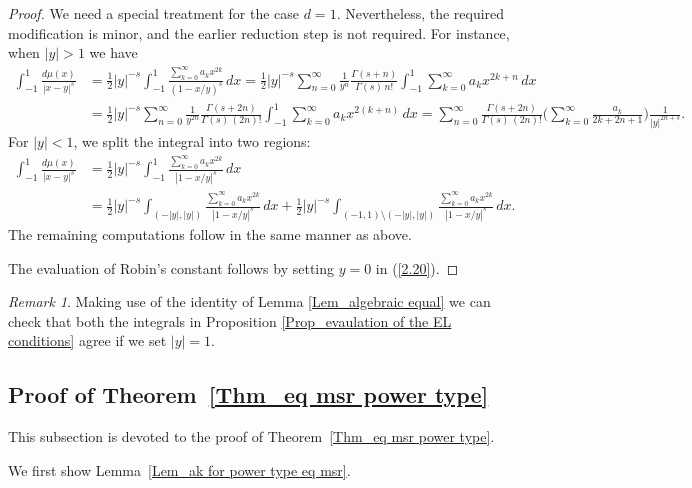 \documentclass[10pt]{amsart}
\theoremstyle{plain}
\theoremstyle{remark}
\newtheorem{rem}{Remark}
\numberwithin{equation}{section}
\begin{document}
\begin{proof}
We need a special treatment for the case $d=1$. Nevertheless, the required modification is minor, and the earlier reduction step is not required. For instance, when $|y|>1$ we have
\begin{align*}
\int_{ -1 }^1 \frac{d\mu(x)}{ |x-y|^s }  &= \frac12 |y|^{-s}\int_{ -1 }^1 \frac{  \sum_{k=0}^\infty a_k x^{2k}  }{ (1-x/y)^s }\,dx
= \frac12 |y|^{-s}\sum_{n=0}^\infty \frac{1}{y^n} \frac{ \Gamma(s+n) }{ \Gamma(s)\,n! } \int_{-1}^1 \sum_{k=0}^\infty a_k x^{2k+n} \,dx  
\\
&=  \frac12 |y|^{-s}\sum_{n=0}^\infty \frac{1}{y^{2n}} \frac{ \Gamma(s+2n) }{ \Gamma(s)\,(2n)! } \int_{-1}^1 \sum_{k=0}^\infty a_k x^{2(k+n)} \,dx  
= \sum_{n=0}^\infty \frac{ \Gamma(s+2n) }{ \Gamma(s)\,(2n)! } \bigg( \sum_{k=0}^\infty \frac{a_k}{2k+2n+1} \bigg) \frac{1}{|y|^{2n+s}} . 
\end{align*}
For $|y|<1$, we split the integral into two regions:
 \begin{align*}
\int_{ -1 }^1 \frac{d\mu(x)}{ |x-y|^s }  &= \frac12 |y|^{-s}\int_{ -1 }^1 \frac{  \sum_{k=0}^\infty a_k x^{2k}  }{ |1-x/y|^s }\,dx 
\\
&= \frac12 |y|^{-s}\int_{ (-|y|,|y|) } \frac{  \sum_{k=0}^\infty a_k x^{2k}  }{ |1-x/y|^s }\,dx   + \frac12 |y|^{-s}\int_{ (-1,1)\setminus (-|y|,|y|) } \frac{  \sum_{k=0}^\infty a_k x^{2k}  }{ |1-x/y|^s }\,dx .
\end{align*} 
The remaining computations follow in the same manner as above.

The evaluation of Robin's constant follows by setting $y=0$ in (\ref{2.20}).
\end{proof}

\begin{rem}
Making use of the identity of Lemma \ref{Lem_algebraic equal} we can check that both the integrals in Proposition \ref{Prop_evaulation of the EL conditions} agree if we set $|y|=1$. 
\end{rem}
 
 



\subsection{Proof of Theorem~\ref{Thm_eq msr power type}}

This subsection is devoted to the proof of Theorem~\ref{Thm_eq msr power type}.

We first show Lemma~\ref{Lem_ak for power type eq msr}. 
\end{document}
